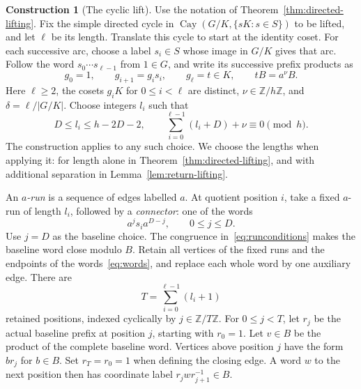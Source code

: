 \documentclass[11pt,a4paper,reqno]{amsart}
\theoremstyle{definition}
\newtheorem{construction}[theorem]{Construction}
\theoremstyle{remark}
\numberwithin{equation}{section}
\DeclareMathOperator{\Cay}{Cay}
\newcommand{\Z}{\mathbb Z}
\begin{document}
\begin{construction}[The cyclic lift]\label{con:cycliclift}
Use the notation of Theorem~\ref{thm:directed-lifting}. Fix the simple directed cycle in $\Cay(G/K,\{sK:s\in S\})$ to be lifted, and let $\ell$ be its length. Translate this cycle to start at the identity coset. For each successive arc, choose a label $s_i\in S$ whose image in $G/K$ gives that arc. Follow the word $s_0\cdots s_{\ell-1}$ from $1\in G$, and write its successive prefix products as
\begin{equation}\label{eq:quotientcycle}
 g_0=1,\qquad g_{i+1}=g_is_i,\qquad g_\ell=t\in K,
 \qquad tB=a^\nu B.
\end{equation}
Here $\ell\ge2$, the cosets $g_iK$ for $0\le i<\ell$ are distinct, $\nu\in\Z/h\Z$, and $\delta=\ell/|G/K|$. Choose integers $l_i$ such that
\begin{equation}\label{eq:runconditions}
 D\le l_i\le h-2D-2,\qquad
 \sum_{i=0}^{\ell-1}(l_i+D)+\nu\equiv0\pmod h.
\end{equation}
The construction applies to any such choice. We choose the lengths when applying it: for length alone in Theorem~\ref{thm:directed-lifting}, and with additional separation in Lemma~\ref{lem:return-lifting}.

An \emph{$a$-run} is a sequence of edges labelled $a$. At quotient position $i$, take a fixed $a$-run of length $l_i$, followed by a \emph{connector}: one of the words
\begin{equation}\label{eq:words}
 a^j s_i a^{D-j},\qquad 0\le j\le D.
\end{equation}
Use $j=D$ as the baseline choice. The congruence in~\eqref{eq:runconditions} makes the baseline word close modulo $B$. Retain all vertices of the fixed runs and the endpoints of the words~\eqref{eq:words}, and replace each whole word by one auxiliary edge. There are
\begin{equation}\label{eq:auxlayers}
 T=\sum_{i=0}^{\ell-1}(l_i+1)
\end{equation}
retained positions, indexed cyclically by $j\in\Z/T\Z$. For $0\le j<T$, let $r_j$ be the actual baseline prefix at position $j$, starting with $r_0=1$. Let $v\in B$ be the product of the complete baseline word. Vertices above position $j$ have the form $br_j$ for $b\in B$. Set $r_T=r_0=1$ when defining the closing edge. A word $w$ to the next position then has coordinate label $r_jwr_{j+1}^{-1}\in B$.


\end{construction}
\end{document}

